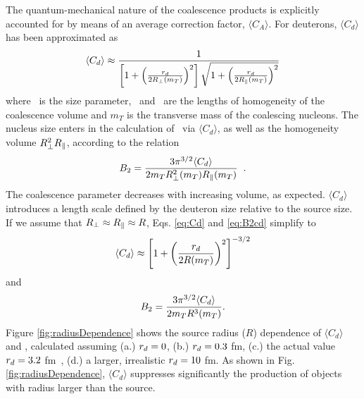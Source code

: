 The quantum-mechanical nature of the coalescence products is explicitly accounted for by means of an average correction factor, $\langle C_{A} \rangle$. For deuterons, $\langle C_{d} \rangle$ has been approximated as 
%
\begin{equation}
\langle C_{d} \rangle \approx \frac{1}{\left[1+ \left(\frac{r_{d}}{2R_{\perp}(m_{T})}\right)^{2}\right] \sqrt{1+ \left(\frac{r_{d}}{2R_{\|}(m_{T})}\right)^{2}}}
\label{eq:Cd}
\end{equation}
%
where \dradius~is the size parameter, \rperp~and \rpar~are the lengths of homogeneity of the coalescence volume and $m_{T}$ is the transverse mass of the coalescing nucleons.
The nucleus size enters in the  calculation of \btwo~via $\langle C_{d} \rangle$, as well as the homogeneity volume $R_{\perp}^{2}R_{\|}$, according to the relation~\cite{Scheibl:1998tk}
%
\begin{equation}
B_{2} = \frac{3\pi^{3/2} \langle C_{d} \rangle}{2m_{T}R_{\perp}^{2}(m_{T})R_{\|}(m_{T})} \;\; .
\label{eq:B2cd}
\end{equation}
%
The coalescence parameter decreases with increasing volume, as expected. 
$\langle C_{d} \rangle$ introduces a length scale defined by the deuteron size relative to the source size. 
If we assume that  $R_{\perp} \approx R_{\|} \approx R$, Eqs. \ref{eq:Cd} and \ref{eq:B2cd} simplify to 
%
\begin{equation}
\langle C_{d} \rangle \approx \left[1+ \left(\frac{r_{d}}{2R(m_{T})}\right)^{2}\right]^{-3/2}
\label{eq:Cdapprox}
\end{equation}
%
and
%
\begin{equation}
B_{2} = \frac{3\pi^{3/2} \langle C_{d} \rangle}{2m_{T}R^{3}(m_{T})}.
\label{eq:B2approx}
\end{equation}
%
Figure \ref{fig:radiusDependence} shows the source radius ($R$) dependence of $\langle C_{d} \rangle$ and \btwo, calculated assuming (a.) $r_{d} = 0$, (b.) $r_{d} = 0.3$ fm, (c.) the actual value $r_{d} = 3.2$ fm~\cite{Mohr:2015ccw}, (d.) a larger, irrealistic $r_{d} = 10$ fm. 
As shown in Fig. \ref{fig:radiusDependence}, $\langle C_{d} \rangle$ suppresses significantly the production of objects with radius larger than the source. 

